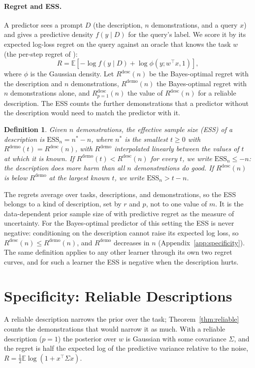 \documentclass{article}
\newtheorem{definition}{Definition}
\newcommand{\ess}{\mathrm{ESS}}
\newcommand{\E}{\mathbb{E}}
\begin{document}
\paragraph{Regret and ESS.} A predictor sees a prompt $D$ (the description, $n$ demonstrations, and a query $x$) and gives a predictive density $f(y \mid D)$ for the query's label. We score it by its expected log-loss regret on the query against an oracle that knows the task $w$ (the per-step regret of \citet{genewein2025}):
\begin{equation}\label{eq:regret}
    R = \E \left[ -\log f(y \mid D) + \log \phi(y; w^\top x, 1) \right],
\end{equation}
where $\phi$ is the Gaussian density. Let $R^{\mathrm{desc}}(n)$ be the Bayes-optimal regret with the description and $n$ demonstrations, $R^{\mathrm{demo}}(n)$ the Bayes-optimal regret with $n$ demonstrations alone, and $R^{\mathrm{desc}}_{p=1}(n)$ the value of $R^{\mathrm{desc}}(n)$ for a reliable description. The ESS counts the further demonstrations that a predictor without the description would need to match the predictor with it.
\begin{definition}\label{def:ess}
Given $n$ demonstrations, the effective sample size (ESS) of a description is $\ess_n = n^* - n$, where $n^*$ is the smallest $t \ge 0$ with $R^{\mathrm{demo}}(t) = R^{\mathrm{desc}}(n)$, with $R^{\mathrm{demo}}$ interpolated linearly between the values of $t$ at which it is known. If $R^{\mathrm{demo}}(t) < R^{\mathrm{desc}}(n)$ for every $t$, we write $\ess_n \le -n$: the description does more harm than all $n$ demonstrations do good. If $R^{\mathrm{desc}}(n)$ is below $R^{\mathrm{demo}}$ at the largest known $t$, we write $\ess_n > t - n$.
\end{definition}
The regrets average over tasks, descriptions, and demonstrations, so the ESS belongs to a kind of description, set by $r$ and $p$, not to one value of $m$. It is the data-dependent prior sample size of \citet{reimherr2021} with predictive regret as the measure of uncertainty. For the Bayes-optimal predictor of this setting the ESS is never negative: conditioning on the description cannot raise its expected log loss, so $R^{\mathrm{desc}}(n) \le R^{\mathrm{demo}}(n)$, and $R^{\mathrm{demo}}$ decreases in $n$ (Appendix~\ref{app:specificity}). The same definition applies to any other learner through its own two regret curves, and for such a learner the ESS is negative when the description hurts.

\section{Specificity: Reliable Descriptions}\label{sec:specificity}
A reliable description narrows the prior over the task; Theorem~\ref{thm:reliable} counts the demonstrations that would narrow it as much. With a reliable description ($p = 1$) the posterior over $w$ is Gaussian with some covariance $\Sigma$, and the regret is half the expected log of the predictive variance relative to the noise, $R = \tfrac12 \E \log(1 + x^\top \Sigma x)$.
\end{document}
